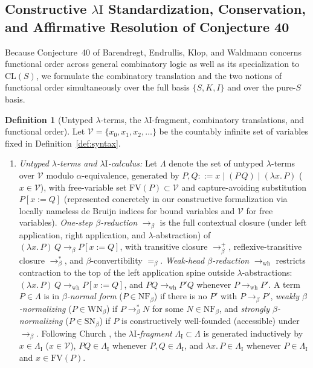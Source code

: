 \documentclass[11pt,reqno]{amsart}
\numberwithin{equation}{section}
\theoremstyle{plain}
\theoremstyle{definition}
\newtheorem{definition}[theorem]{Definition}
\theoremstyle{remark}
\newcommand{\CLS}{\mathrm{CL}(S)}
\newcommand{\NF}{\mathrm{NF}}
\newcommand{\SN}{\mathrm{SN}}
\newcommand{\WN}{\mathrm{WN}}
\begin{document}
\subsection{Constructive \texorpdfstring{$\lambda\mathrm{I}$}{lambda-I} Standardization, Conservation, and Affirmative Resolution of Conjecture 40}\label{subsec:lambdaI-conservation-conj40}

Because Conjecture~40 of Barendregt, Endrullis, Klop, and Waldmann \cite[p.~102]{BarendregtEndrullisKlopWaldmann2017} concerns functional order across general combinatory logic as well as its specialization to $\CLS$, we formulate the combinatory translation and the two notions of functional order simultaneously over the full basis $\{S, K, I\}$ and over the pure-$S$ basis.

\begin{definition}[Untyped $\lambda$-terms, the $\lambda\mathrm{I}$-fragment, combinatory translations, and functional order]\label{def:lambda-translation-order}
Let $\mathcal{V} = \{x_0, x_1, x_2, \dots\}$ be the countably infinite set of variables fixed in Definition~\ref{def:syntax}.
\begin{enumerate}[label=(\roman*),leftmargin=2.2em]
  \item \emph{Untyped $\lambda$-terms and $\lambda\mathrm{I}$-calculus:} Let $\Lambda$ denote the set of untyped $\lambda$-terms over $\mathcal{V}$ modulo $\alpha$-equivalence, generated by $P, Q ::= x \mid (P\,Q) \mid (\lambda x.\, P)$ ($x \in \mathcal{V}$), with free-variable set $\mathrm{FV}(P) \subset \mathcal{V}$ and capture-avoiding substitution $P[x := Q]$ (represented concretely in our constructive formalization via locally nameless de Bruijn indices for bound variables and $\mathcal{V}$ for free variables). \emph{One-step $\beta$-reduction} $\to_\beta$ is the full contextual closure (under left application, right application, and $\lambda$-abstraction) of $(\lambda x.\, P)\,Q \to_\beta P[x := Q]$, with transitive closure $\to_\beta^+$, reflexive-transitive closure $\to_\beta^*$, and $\beta$-convertibility $=_\beta$. \emph{Weak-head $\beta$-reduction} $\to_{\mathrm{wh}}$ restricts contraction to the top of the left application spine outside $\lambda$-abstractions: $(\lambda x.\, P)\,Q \to_{\mathrm{wh}} P[x := Q]$, and $P Q \to_{\mathrm{wh}} P' Q$ whenever $P \to_{\mathrm{wh}} P'$. A term $P \in \Lambda$ is in \emph{$\beta$-normal form} ($P \in \NF_\beta$) if there is no $P'$ with $P \to_\beta P'$, \emph{weakly $\beta$-normalizing} ($P \in \WN_\beta$) if $P \to_\beta^* N$ for some $N \in \NF_\beta$, and \emph{strongly $\beta$-normalizing} ($P \in \SN_\beta$) if $P$ is constructively well-founded (accessible) under $\to_\beta$. Following Church \cite{Church1941}, the \emph{$\lambda\mathrm{I}$-fragment} $\Lambda_{\mathrm{I}} \subset \Lambda$ is generated inductively by $x \in \Lambda_{\mathrm{I}}$ ($x \in \mathcal{V}$), $P Q \in \Lambda_{\mathrm{I}}$ whenever $P, Q \in \Lambda_{\mathrm{I}}$, and $\lambda x.\, P \in \Lambda_{\mathrm{I}}$ whenever $P \in \Lambda_{\mathrm{I}}$ and $x \in \mathrm{FV}(P)$.

\end{enumerate}
\end{definition}
\end{document}
